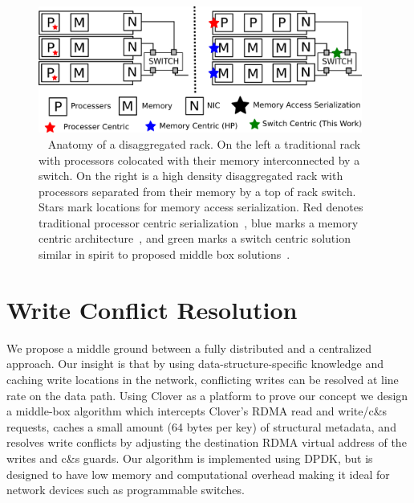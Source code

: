 
\begin{figure}
      \centering
      \includegraphics[width=0.95\textwidth]{fig/overview.png}
      \caption{~
      Anatomy of a disaggregated rack. On the left a
      traditional rack with processors colocated with their memory
      interconnected by a switch. On the right is a high density
      disaggregated rack with processors separated from their memory
      by a top of rack switch. Stars mark locations for memory access
      serialization. Red denotes traditional processor centric
      serialization~\cite{memc3, cell, sonuma, storm, clover}, blue marks a
      memory centric architecture~\cite{aguilera2019designing}, and
      green marks a switch centric solution similar in spirit to
      proposed middle box solutions~\cite{254120}.
      \label{fig:overview}
      }
\end{figure}

\section{Write Conflict Resolution}

We propose a middle ground between a fully distributed and a
centralized approach.  Our insight is that by using
data-structure-specific knowledge and caching write locations in the
network, conflicting writes can be resolved at line rate on the data
path.  Using Clover as a platform to prove our concept we design a
middle-box algorithm which intercepts Clover's RDMA read and
write/c\&s requests, caches a small amount (64 bytes per key) of
structural metadata, and resolves write conflicts by adjusting the
destination RDMA virtual address of the writes and c\&s guards. Our
algorithm is implemented using DPDK, but is designed to have low
memory and computational overhead making it ideal for network devices
such as programmable switches.


